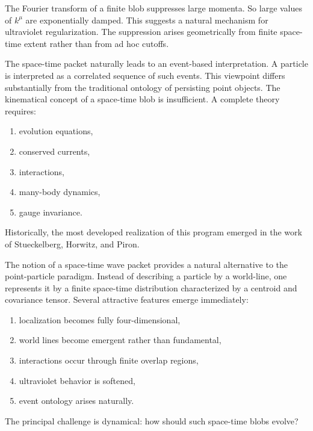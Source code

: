 The Fourier transform of a finite blob suppresses large momenta.
So large values of $k^\mu$
are exponentially damped.
This suggests a natural mechanism for ultraviolet regularization.
The suppression arises geometrically from finite space-time extent 
rather than from ad hoc cutoffs.

The space-time packet naturally leads to an event-based interpretation.
A particle is interpreted as a correlated sequence of such events.
This viewpoint differs substantially from the traditional ontology of 
persisting point objects.
The kinematical concept of a space-time blob is insufficient.
A complete theory requires:
\begin{enumerate}
\item evolution equations,
\item conserved currents,
\item interactions,
\item many-body dynamics,
\item gauge invariance.
\end{enumerate}
Historically, the most developed realization of this program emerged in the 
work of Stueckelberg, Horwitz, and Piron.

The notion of a space-time wave packet provides a natural alternative to the 
point-particle paradigm. Instead of describing a particle by a world-line, 
one represents it by a finite space-time distribution characterized by 
a centroid and covariance tensor.
Several attractive features emerge immediately:
\begin{enumerate}
\item localization becomes fully four-dimensional,
\item world lines become emergent rather than fundamental,
\item interactions occur through finite overlap regions,
\item ultraviolet behavior is softened,
\item event ontology arises naturally.
\end{enumerate}
The principal challenge is dynamical: how should such space-time blobs evolve?

